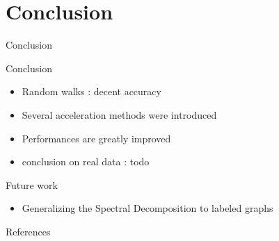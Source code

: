 \documentclass[compress]{beamer}
\begin{document}
\section{Conclusion}
\begin{frame}{Conclusion}
\begin{block}{Conclusion}
	\begin{itemize}
		\item Random walks : decent accuracy
		\item Several acceleration methods were introduced
		\item Performances are greatly improved
		\item conclusion on real data : todo
	\end{itemize}
\end{block}
\begin{block}{Future work}
	\begin{itemize}
		\item Generalizing the Spectral Decomposition to labeled graphs
	\end{itemize}
\end{block}
\end{frame}

\renewcommand\bibsection{\subsection{\refname}}
\begin{frame}{References}
\nocite{bondy1976graph,borgwardt_protein_2005,imrich2000product,burges_tutorial_1998,vapnik_statistical_1998,nesterov_lectures_2018,shervashidze_efficient_2009}
\footnotesize

\end{frame}

\appendix
\end{document}
